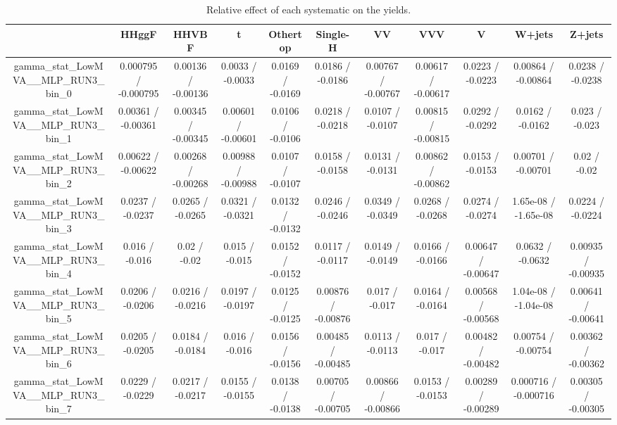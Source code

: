 \documentclass[10pt]{article}
\begin{document}
\begin{table}[htbp]
\begin{center}
\begin{tabular}{|c|c|c|c|c|c|c|c|c|c|c|}
\hline 
      & HHggF      & HHVBF      & t      & Othertop      & Single-H      & VV      & VVV      & V      & W+jets      & Z+jets \\ 
\hline 
  gamma_stat_LowMVA__MLP_RUN3_bin_0 & 0.000795 / -0.000795 & 0.00136 / -0.00136 & 0.0033 / -0.0033 & 0.0169 / -0.0169 & 0.0186 / -0.0186 & 0.00767 / -0.00767 & 0.00617 / -0.00617 & 0.0223 / -0.0223 & 0.00864 / -0.00864 & 0.0238 / -0.0238 \\ 
  gamma_stat_LowMVA__MLP_RUN3_bin_1 & 0.00361 / -0.00361 & 0.00345 / -0.00345 & 0.00601 / -0.00601 & 0.0106 / -0.0106 & 0.0218 / -0.0218 & 0.0107 / -0.0107 & 0.00815 / -0.00815 & 0.0292 / -0.0292 & 0.0162 / -0.0162 & 0.023 / -0.023 \\ 
  gamma_stat_LowMVA__MLP_RUN3_bin_2 & 0.00622 / -0.00622 & 0.00268 / -0.00268 & 0.00988 / -0.00988 & 0.0107 / -0.0107 & 0.0158 / -0.0158 & 0.0131 / -0.0131 & 0.00862 / -0.00862 & 0.0153 / -0.0153 & 0.00701 / -0.00701 & 0.02 / -0.02 \\ 
  gamma_stat_LowMVA__MLP_RUN3_bin_3 & 0.0237 / -0.0237 & 0.0265 / -0.0265 & 0.0321 / -0.0321 & 0.0132 / -0.0132 & 0.0246 / -0.0246 & 0.0349 / -0.0349 & 0.0268 / -0.0268 & 0.0274 / -0.0274 & 1.65e-08 / -1.65e-08 & 0.0224 / -0.0224 \\ 
  gamma_stat_LowMVA__MLP_RUN3_bin_4 & 0.016 / -0.016 & 0.02 / -0.02 & 0.015 / -0.015 & 0.0152 / -0.0152 & 0.0117 / -0.0117 & 0.0149 / -0.0149 & 0.0166 / -0.0166 & 0.00647 / -0.00647 & 0.0632 / -0.0632 & 0.00935 / -0.00935 \\ 
  gamma_stat_LowMVA__MLP_RUN3_bin_5 & 0.0206 / -0.0206 & 0.0216 / -0.0216 & 0.0197 / -0.0197 & 0.0125 / -0.0125 & 0.00876 / -0.00876 & 0.017 / -0.017 & 0.0164 / -0.0164 & 0.00568 / -0.00568 & 1.04e-08 / -1.04e-08 & 0.00641 / -0.00641 \\ 
  gamma_stat_LowMVA__MLP_RUN3_bin_6 & 0.0205 / -0.0205 & 0.0184 / -0.0184 & 0.016 / -0.016 & 0.0156 / -0.0156 & 0.00485 / -0.00485 & 0.0113 / -0.0113 & 0.017 / -0.017 & 0.00482 / -0.00482 & 0.00754 / -0.00754 & 0.00362 / -0.00362 \\ 
  gamma_stat_LowMVA__MLP_RUN3_bin_7 & 0.0229 / -0.0229 & 0.0217 / -0.0217 & 0.0155 / -0.0155 & 0.0138 / -0.0138 & 0.00705 / -0.00705 & 0.00866 / -0.00866 & 0.0153 / -0.0153 & 0.00289 / -0.00289 & 0.000716 / -0.000716 & 0.00305 / -0.00305 \\ 
\hline 
\end{tabular} 
\caption{Relative effect of each systematic on the yields.} 
\end{center} 
\end{table} 
\end{document}
